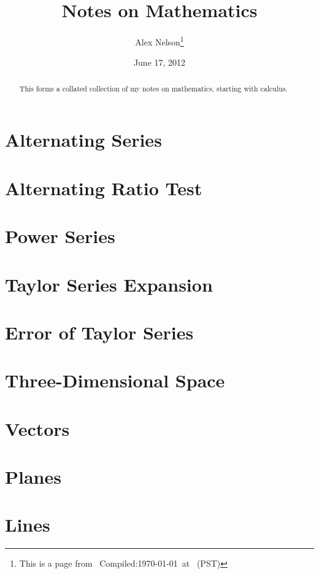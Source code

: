 \documentclass{article}
\title{Notes on Mathematics}
\date{June 17, 2012}
\author{Alex Nelson\thanks{This is a page from \homeurl{}\hfil\break\indent\;\, Compiled:\enspace\today\ at \currenttime\ (PST)}}
\begin{document}
\maketitle
\begin{abstract}
This forms a collated collection of my notes on mathematics,
starting with calculus.
\end{abstract}
\tableofcontents\clearpage

\section{Alternating Series}      %

\section{Alternating Ratio Test}  %

\section{Power Series}            %

\section{Taylor Series Expansion} %

\section{Error of Taylor Series}  %


\section{Three-Dimensional Space} %


\section{Vectors}
\section{Planes}
\section{Lines}
\end{document}

